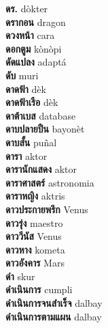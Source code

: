 \textbf{ ดร.  } dòkter \\
\textbf{ ดรากอน  } dragon \\
\textbf{ ดวงหน้า  } cara \\
\textbf{ ดอกตูม  } kònòpi \\
\textbf{ ดัดแปลง  } adaptá \\
\textbf{ ดับ  } muri \\
\textbf{ ดาดฟ้า  } dèk \\
\textbf{ ดาดฟ้าเรือ  } dèk \\
\textbf{ ดาต้าเบส  } database \\
\textbf{ ดาบปลายปืน  } bayonèt \\
\textbf{ ดาบสั้น  } puñal \\
\textbf{ ดารา  } aktor \\
\textbf{ ดารานักแสดง  } aktor \\
\textbf{ ดาราศาสตร์  } astronomia \\
\textbf{ ดาราหญิง  } aktris \\
\textbf{ ดาวประกายพรึก  } Venus \\
\textbf{ ดาวรุ่ง  } maestro \\
\textbf{ ดาววีนัส  } Venus \\
\textbf{ ดาวหาง  } kometa \\
\textbf{ ดาวอังคาร  } Mars \\
\textbf{ ดำ  } skur \\
\textbf{ ดำเนินการ  } cumpli \\
\textbf{ ดำเนินการจนสำเร็จ  } dalbay \\
\textbf{ ดำเนินการตามแผน  } dalbay \\
